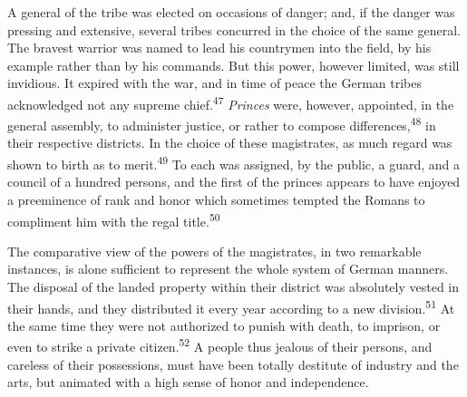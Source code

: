 

A general of the tribe was elected on occasions of danger; and,
if the danger was pressing and extensive, several tribes
concurred in the choice of the same general. The bravest warrior
was named to lead his countrymen into the field, by his example
rather than by his commands. But this power, however limited, was
still invidious. It expired with the war, and in time of peace
the German tribes acknowledged not any supreme chief.\textsuperscript{47}
\textit{Princes} were, however, appointed, in the general assembly, to
administer justice, or rather to compose differences,\textsuperscript{48} in their
respective districts. In the choice of these magistrates, as much
regard was shown to birth as to merit.\textsuperscript{49} To each was assigned,
by the public, a guard, and a council of a hundred persons, and
the first of the princes appears to have enjoyed a preeminence of
rank and honor which sometimes tempted the Romans to compliment
him with the regal title.\textsuperscript{50}





The comparative view of the powers of the magistrates, in two
remarkable instances, is alone sufficient to represent the whole
system of German manners. The disposal of the landed property
within their district was absolutely vested in their hands, and
they distributed it every year according to a new division.\textsuperscript{51} At
the same time they were not authorized to punish with death, to
imprison, or even to strike a private citizen.\textsuperscript{52} A people thus
jealous of their persons, and careless of their possessions, must
have been totally destitute of industry and the arts, but
animated with a high sense of honor and independence.



